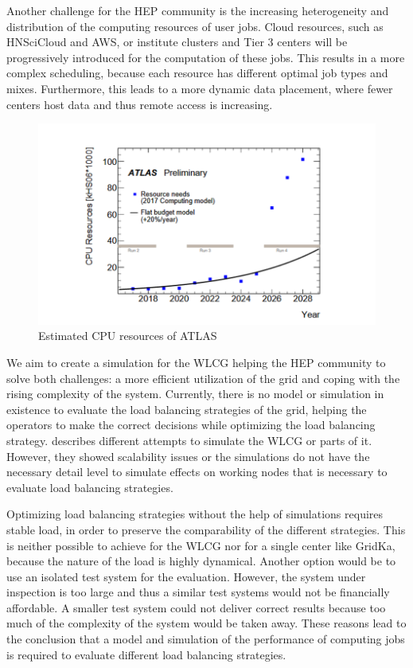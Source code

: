 \documentclass[a4paper]{jpconf}
\begin{document}
Another challenge for the HEP community is the increasing heterogeneity and distribution of the computing resources of user jobs. Cloud resources, such as HNSciCloud and AWS, or institute clusters and Tier 3 centers will be progressively introduced for the computation of these jobs. This results in a more complex scheduling, because each resource has different optimal job types and mixes. Furthermore, this leads to a more dynamic data placement, where fewer centers host data and thus remote access is increasing.

\begin{figure}
	\centering
	\includegraphics[width=0.7\linewidth]{images/resources}
	\caption[]{Estimated CPU resources of ATLAS \cite{community}}
	\label{resources}
\end{figure}

We aim to create a simulation for the WLCG helping the HEP community to solve both challenges: a more efficient utilization of the grid and coping with the rising complexity of the system.
Currently, there is no model or simulation in existence to evaluate the load balancing strategies of the grid, helping the operators to make the correct decisions while optimizing the load balancing strategy.
 describes different attempts to simulate the WLCG or parts of it. However, they showed scalability issues or the simulations do not have the necessary detail level to simulate effects on working nodes that is necessary to evaluate load balancing strategies.

Optimizing load balancing strategies without the help of simulations requires stable load, in order to preserve the comparability of the different strategies. This is neither possible to achieve for the WLCG nor for a single center like GridKa, because the nature of the load is highly dynamical. Another option would be to use an isolated test system for the evaluation. However, the system under inspection is too large and thus a similar test systems would not be financially affordable. A smaller test system could not deliver correct results because too much of the complexity of the system would be taken away.
These reasons lead to the conclusion that a model and simulation of the performance of computing jobs is required to evaluate different load balancing strategies.
\end{document}
